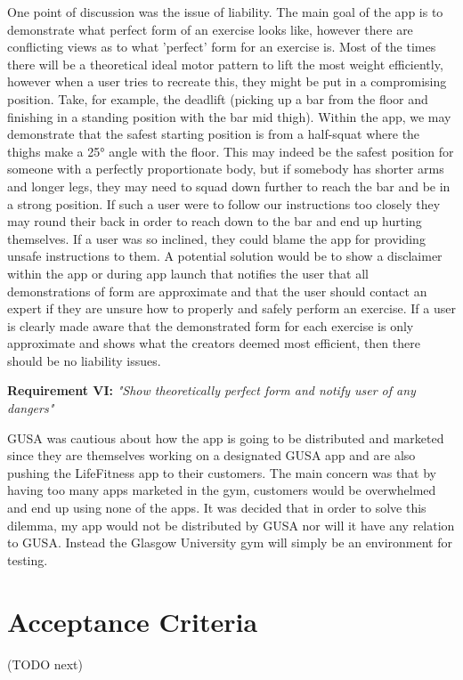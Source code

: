 \documentclass{l4proj}
\begin{document}
One point of discussion was the issue of liability. The main goal of the app is to demonstrate what perfect form of an exercise looks like, however there are conflicting views as to what 'perfect' form for an exercise is. Most of the times there will be a theoretical ideal motor pattern to lift the most weight efficiently, however when a user tries to recreate this, they might be put in a compromising position. Take, for example, the deadlift (picking up a bar from the floor and finishing in a standing position with the bar mid thigh). Within the app, we may demonstrate that the safest starting position is from a half-squat where the thighs make a 25° angle with the floor. This may indeed be the safest position for someone with a perfectly proportionate body, but if somebody has shorter arms and longer legs, they may need to squad down further to reach the bar and be in a strong position. If such a user were to follow our instructions too closely they may round their back in order to reach down to the bar and end up hurting themselves. If a user was so inclined, they could blame the app for providing unsafe instructions to them. A potential solution would be to show a disclaimer within the app or during app launch that notifies the user that all demonstrations of form are approximate and that the user should contact an expert if they are unsure how to properly and safely perform an exercise. If a user is clearly made aware that the demonstrated form for each exercise is only approximate and shows what the creators deemed most efficient, then there should be no liability issues. 

\textbf{Requirement VI:} \textit{"Show theoretically perfect form and notify user of any dangers"} 

GUSA was cautious about how the app is going to be distributed and marketed since they are themselves working on a designated GUSA app and are also pushing the LifeFitness app to their customers. The main concern was that by having too many apps marketed in the gym, customers would be overwhelmed and end up using none of the apps. It was decided that in order to solve this dilemma, my app would not be distributed by GUSA nor will it have any relation to GUSA. Instead the Glasgow University gym will simply be an environment for testing. 

\section{Acceptance Criteria}
(TODO next)
\end{document}
